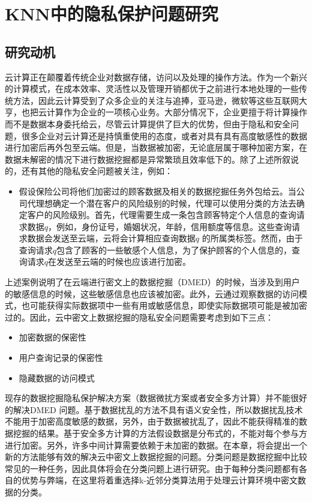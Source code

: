 \chapter{KNN中的隐私保护问题研究}

\section{研究动机}
\vspace{-0.2cm}
云计算正在颠覆着传统企业对数据存储，访问以及处理的操作方法。作为一个新兴的计算模式，在成本效率、灵活性以及管理开销都优于之前进行本地处理的一些传统方法，因此云计算受到了众多企业的关注与追捧，亚马逊，微软等这些互联网大亨，也把云计算作为企业的一项核心业务。大部分情况下，企业更擅于将计算操作而不是数据本身委托给云，尽管云计算提供了巨大的优势，但由于隐私和安全问题，很多企业对云计算还是持慎重使用的态度，或者对具有具有高度敏感性的数据进行加密后再外包至云端。但是，当数据被加密，无论底层属于哪种加密方案，在数据未解密的情况下进行数据挖掘都是异常繁琐且效率低下的。除了上述所叙说的，还有其他的隐私安全问题被关注，例如：
\begin{itemize}
\item 假设保险公司将他们加密过的顾客数据及相关的数据挖掘任务外包给云。当公司代理想确定一个潜在客户的风险级别的时候，代理可以使用分类的方法去确定客户的风险级别。首先，代理需要生成一条包含顾客特定个人信息的查询请求数据$q$，例如，身份证号，婚姻状况，年龄，信用额度等信息。这些查询请求数据会发送至云端，云将会计算相应查询数据$q$ 的所属类标签。然而，由于查询请求$q$包含了顾客的一些敏感个人信息，为了保护顾客的个人信息的，查询请求$q$在发送至云端的时候也应该进行加密。
\end{itemize}

上述案例说明了在云端进行密文上的数据挖掘（DMED）的时候，当涉及到用户的敏感信息的时候，这些敏感信息也应该被加密。此外，云通过观察数据的访问模式，也可能获得实际数据项中一些有用或敏感信息，即使实际数据项可能是被加密过的\cite{di2012managing}\cite{williams2008building}。因此，云中密文上数据挖掘的隐私安全问题需要考虑到如下三点：
\begin{itemize}
\item 加密数据的保密性
\item 用户查询记录的保密性
\item 隐藏数据的访问模式
\end{itemize}

现存的数据挖掘隐私保护解决方案（数据微扰方案或者安全多方计算）并不能很好的解决DMED 问题。基于数据扰乱的方法不具有语义安全性，所以数据扰乱技术不能用于加密高度敏感的数据，另外，由于数据被扰乱了，因此不能获得精准的数据挖掘的结果。基于安全多方计算的方法假设数据是分布式的，不能对每个参与方进行加密。另外，许多中间计算需要依赖于未加密的数据。在本章，将会提出一个新的方法能够有效的解决云中密文上数据挖掘的问题。分类问题是数据挖掘中比较常见的一种任务，因此具体将会在分类问题上进行研究。由于每种分类问题都有各自的优势与弊端，在这里将着重选择k-近邻分类算法用于处理云计算环境中密文数据的分类。

